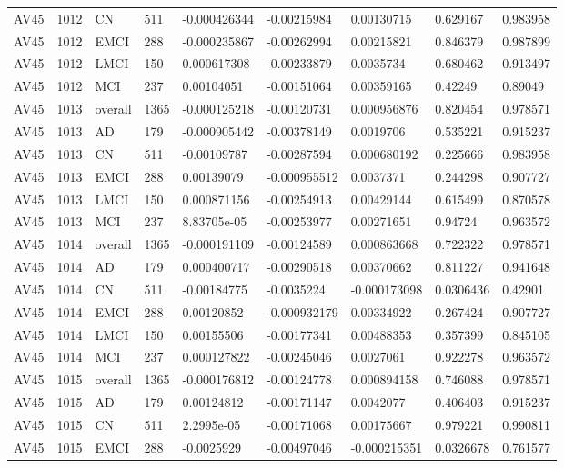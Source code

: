 \begin{landscape}
\begin{longtable}{lllllllll}
AV45 & 1012 & CN & 511 & -0.000426344 & -0.00215984 & 0.00130715 & 0.629167 & 0.983958 \\
AV45 & 1012 & EMCI & 288 & -0.000235867 & -0.00262994 & 0.00215821 & 0.846379 & 0.987899 \\
AV45 & 1012 & LMCI & 150 & 0.000617308 & -0.00233879 & 0.0035734 & 0.680462 & 0.913497 \\
AV45 & 1012 & MCI & 237 & 0.00104051 & -0.00151064 & 0.00359165 & 0.42249 & 0.89049 \\
AV45 & 1013 & overall & 1365 & -0.000125218 & -0.00120731 & 0.000956876 & 0.820454 & 0.978571 \\
AV45 & 1013 & AD & 179 & -0.000905442 & -0.00378149 & 0.0019706 & 0.535221 & 0.915237 \\
AV45 & 1013 & CN & 511 & -0.00109787 & -0.00287594 & 0.000680192 & 0.225666 & 0.983958 \\
AV45 & 1013 & EMCI & 288 & 0.00139079 & -0.000955512 & 0.0037371 & 0.244298 & 0.907727 \\
AV45 & 1013 & LMCI & 150 & 0.000871156 & -0.00254913 & 0.00429144 & 0.615499 & 0.870578 \\
AV45 & 1013 & MCI & 237 & 8.83705e-05 & -0.00253977 & 0.00271651 & 0.94724 & 0.963572 \\
AV45 & 1014 & overall & 1365 & -0.000191109 & -0.00124589 & 0.000863668 & 0.722322 & 0.978571 \\
AV45 & 1014 & AD & 179 & 0.000400717 & -0.00290518 & 0.00370662 & 0.811227 & 0.941648 \\
AV45 & 1014 & CN & 511 & -0.00184775 & -0.0035224 & -0.000173098 & 0.0306436 & 0.42901 \\
AV45 & 1014 & EMCI & 288 & 0.00120852 & -0.000932179 & 0.00334922 & 0.267424 & 0.907727 \\
AV45 & 1014 & LMCI & 150 & 0.00155506 & -0.00177341 & 0.00488353 & 0.357399 & 0.845105 \\
AV45 & 1014 & MCI & 237 & 0.000127822 & -0.00245046 & 0.0027061 & 0.922278 & 0.963572 \\
AV45 & 1015 & overall & 1365 & -0.000176812 & -0.00124778 & 0.000894158 & 0.746088 & 0.978571 \\
AV45 & 1015 & AD & 179 & 0.00124812 & -0.00171147 & 0.0042077 & 0.406403 & 0.915237 \\
AV45 & 1015 & CN & 511 & 2.2995e-05 & -0.00171068 & 0.00175667 & 0.979221 & 0.990811 \\
AV45 & 1015 & EMCI & 288 & -0.0025929 & -0.00497046 & -0.000215351 & 0.0326678 & 0.761577 \\

\end{longtable}
\end{landscape}
